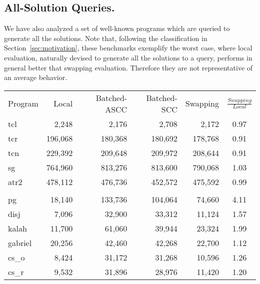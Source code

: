 \documentclass{./tlp}
\newcommand{\redsect}{\vspace{-1em}}
\begin{document}
\redsect
\subsection{All-Solution Queries.}
\label{sec:swapping-win}





We have also analyzed a set of well-known programs which are queried
to generate all the solutions.  
Note that, following the classification in
Section~\ref{sec:motivation}, these benchmarks exemplify the worst
case, where local evaluation, naturally devised to generate all the
solutions to a query, performs in general better that swapping
evaluation.  Therefore they are not representative of an average
behavior. 

\begin{table}[t] 
  \centering 
  \begin{tabular}{|l|r|r|r|r|c|} 
    \cline{1-6} 
    Program   & Local  & Batched-ASCC & Batched-SCC & Swapping & $\frac{Swapping}{Local}$
    \\\cline{1-6}
    tcl       & 2,248   & 2,176    & 2,708      & 2,172   & 0.97
    \\\cline{1-6}             
    tcr       & 196,068 & 180,368  & 180,692    & 178,768 & 0.91
    \\\cline{1-6}             
    tcn       & 229,392 & 209,648  & 209,972    & 208,644 & 0.91 
    \\\cline{1-6}             
    sg       & 764,960 & 813,276  & 813,600    & 790,068 & 1.03 
    \\\cline{1-6}             
    atr2      & 478,112 & 476,736  & 452,572    & 475,592 & 0.99 
    \\\cline{1-6}
    \multicolumn{6}{c}{}
    \\[-2ex]\cline{1-6}             
    pg        & 18,140  & 133,736  & 104,064    & 74,660  & 4.11 
    \\\cline{1-6}             
    disj      & 7,096   & 32,900   & 33,312     & 11,124  & 1.57 
    \\\cline{1-6}             
    kalah     & 11,700  & 61,060   & 39,944     & 23,324  & 1.99 
    \\\cline{1-6}             
    gabriel   & 20,256  & 42,460   & 42,268     & 22,700  & 1.12 
    \\\cline{1-6}             
    cs\_o     & 8,424   & 31,172   & 31,268     & 10,596  & 1.26 
    \\\cline{1-6}             
    cs\_r     & 9,532   & 31,896   & 28,976     & 11,420  & 1.20 

\end{tabular}
\end{table}
\end{document}
